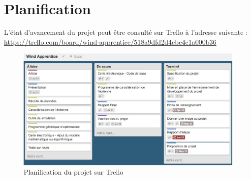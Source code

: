 \section{Planification} %
\label{sec:Planification}

L'état d'avancement du projet peut être consulté sur Trello à l'adresse suivante : 
\\
\url{https://trello.com/board/wind-apprentice/518a9dfd2d4ebe4e1a000b36}


\begin{figure}[H]
\label{fig:planif}
\centering
\includegraphics[width=\textwidth]{images/avancement.jpg}
\caption{Planification du projet sur Trello}
\end{figure}

